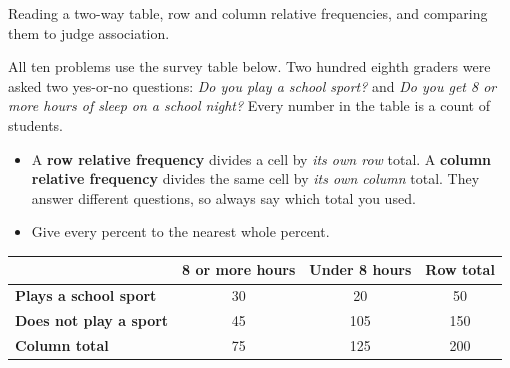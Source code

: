 \documentclass[12pt]{article}
\begin{document}

\noindent\small
Reading a two-way table, row and column relative frequencies, and comparing them
to judge association.
\par\smallskip
All ten problems use the survey table below. Two hundred eighth graders were
asked two yes-or-no questions: \emph{Do you play a school sport?} and
\emph{Do you get 8 or more hours of sleep on a school night?} Every number in
the table is a count of students.
\begin{itemize}[leftmargin=0.8cm, itemsep=1pt, topsep=2pt]
  \item A \textbf{row relative frequency} divides a cell by \emph{its own row}
        total. A \textbf{column relative frequency} divides the same cell by
        \emph{its own column} total. They answer different questions, so always
        say which total you used.
  \item Give every percent to the nearest whole percent.
\end{itemize}
\normalsize

\begin{center}
\renewcommand{\arraystretch}{1.35}
\begin{tabular}{|l|c|c|c|}
\hline
 & \textbf{8 or more hours} & \textbf{Under 8 hours} & \textbf{Row total} \\
\hline
\textbf{Plays a school sport} & 30 & 20 & 50 \\
\hline
\textbf{Does not play a sport} & 45 & 105 & 150 \\
\hline
\textbf{Column total} & 75 & 125 & 200 \\
\hline
\end{tabular}
\end{center}
\vspace{0.3cm}




\end{document}
